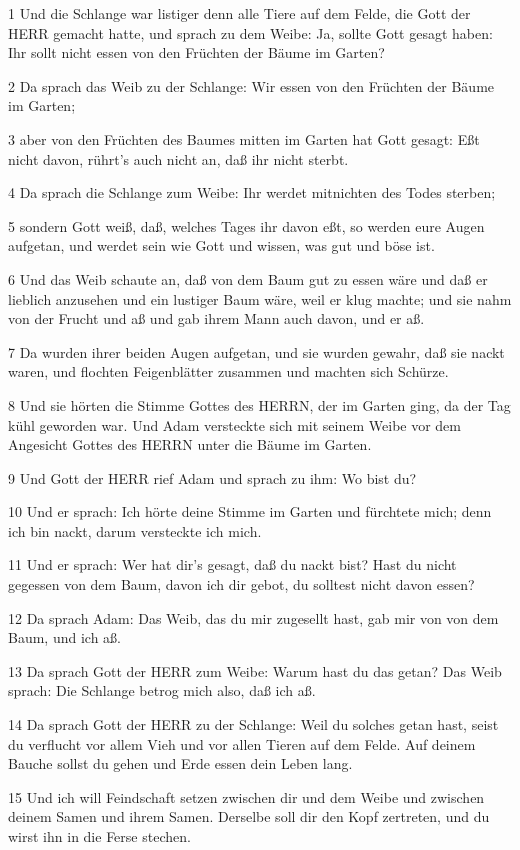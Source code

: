\par 1 Und die Schlange war listiger denn alle Tiere auf dem Felde, die Gott der HERR gemacht hatte, und sprach zu dem Weibe: Ja, sollte Gott gesagt haben: Ihr sollt nicht essen von den Früchten der Bäume im Garten?
\par 2 Da sprach das Weib zu der Schlange: Wir essen von den Früchten der Bäume im Garten;
\par 3 aber von den Früchten des Baumes mitten im Garten hat Gott gesagt: Eßt nicht davon, rührt's auch nicht an, daß ihr nicht sterbt.
\par 4 Da sprach die Schlange zum Weibe: Ihr werdet mitnichten des Todes sterben;
\par 5 sondern Gott weiß, daß, welches Tages ihr davon eßt, so werden eure Augen aufgetan, und werdet sein wie Gott und wissen, was gut und böse ist.
\par 6 Und das Weib schaute an, daß von dem Baum gut zu essen wäre und daß er lieblich anzusehen und ein lustiger Baum wäre, weil er klug machte; und sie nahm von der Frucht und aß und gab ihrem Mann auch davon, und er aß.
\par 7 Da wurden ihrer beiden Augen aufgetan, und sie wurden gewahr, daß sie nackt waren, und flochten Feigenblätter zusammen und machten sich Schürze.
\par 8 Und sie hörten die Stimme Gottes des HERRN, der im Garten ging, da der Tag kühl geworden war. Und Adam versteckte sich mit seinem Weibe vor dem Angesicht Gottes des HERRN unter die Bäume im Garten.
\par 9 Und Gott der HERR rief Adam und sprach zu ihm: Wo bist du?
\par 10 Und er sprach: Ich hörte deine Stimme im Garten und fürchtete mich; denn ich bin nackt, darum versteckte ich mich.
\par 11 Und er sprach: Wer hat dir's gesagt, daß du nackt bist? Hast du nicht gegessen von dem Baum, davon ich dir gebot, du solltest nicht davon essen?
\par 12 Da sprach Adam: Das Weib, das du mir zugesellt hast, gab mir von von dem Baum, und ich aß.
\par 13 Da sprach Gott der HERR zum Weibe: Warum hast du das getan? Das Weib sprach: Die Schlange betrog mich also, daß ich aß.
\par 14 Da sprach Gott der HERR zu der Schlange: Weil du solches getan hast, seist du verflucht vor allem Vieh und vor allen Tieren auf dem Felde. Auf deinem Bauche sollst du gehen und Erde essen dein Leben lang.
\par 15 Und ich will Feindschaft setzen zwischen dir und dem Weibe und zwischen deinem Samen und ihrem Samen. Derselbe soll dir den Kopf zertreten, und du wirst ihn in die Ferse stechen.
